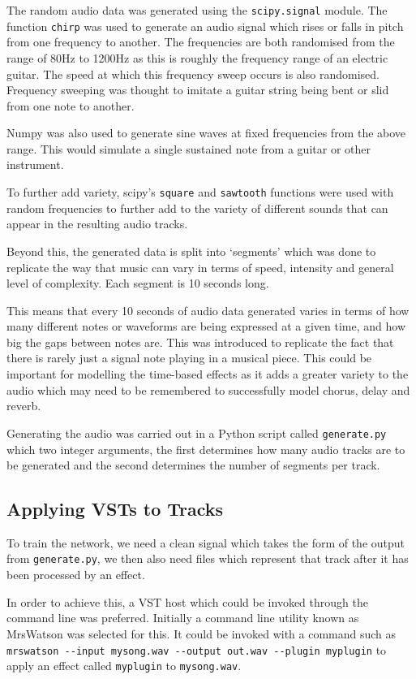 \documentclass{l4proj}
\begin{document}
The random audio data was generated using the \texttt{scipy.signal}
module. The function \texttt{chirp} was used to generate an audio signal
which rises or falls in pitch from one frequency to another. The
frequencies are both randomised from the range of 80Hz to 1200Hz as this
is roughly the frequency range of an electric guitar. The speed at which
this frequency sweep occurs is also randomised. Frequency sweeping was
thought to imitate a guitar string being bent or slid from one note to
another.

Numpy was also used to generate sine waves at fixed frequencies from the
above range. This would simulate a single sustained note from a guitar
or other instrument.

To further add variety, scipy's \texttt{square} and \texttt{sawtooth}
functions were used with random frequencies to further add to the
variety of different sounds that can appear in the resulting audio
tracks.

Beyond this, the generated data is split into `segments' which was done
to replicate the way that music can vary in terms of speed, intensity
and general level of complexity. Each segment is 10 seconds long.

This means that every 10 seconds of audio data generated varies in terms
of how many different notes or waveforms are being expressed at a given
time, and how big the gaps between notes are. This was introduced to
replicate the fact that there is rarely just a signal note playing in a
musical piece. This could be important for modelling the time-based
effects as it adds a greater variety to the audio which may need to be
remembered to successfully model chorus, delay and reverb.

Generating the audio was carried out in a Python script called
\texttt{generate.py} which two integer arguments, the first determines
how many audio tracks are to be generated and the second determines the
number of segments per track.

\subsection{Applying VSTs to Tracks}\label{applying-vsts-to-tracks}

To train the network, we need a clean signal which takes the form of the
output from \texttt{generate.py}, we then also need files which
represent that track after it has been processed by an effect.

In order to achieve this, a VST host which could be invoked through the
command line was preferred. Initially a command line utility known as
MrsWatson was selected for this. It could be invoked with a command such
as
\texttt{mrswatson\ -\/-input\ mysong.wav\ -\/-output\ out.wav\ -\/-plugin\ myplugin}
to apply an effect called \texttt{myplugin} to \texttt{mysong.wav}.
\end{document}
